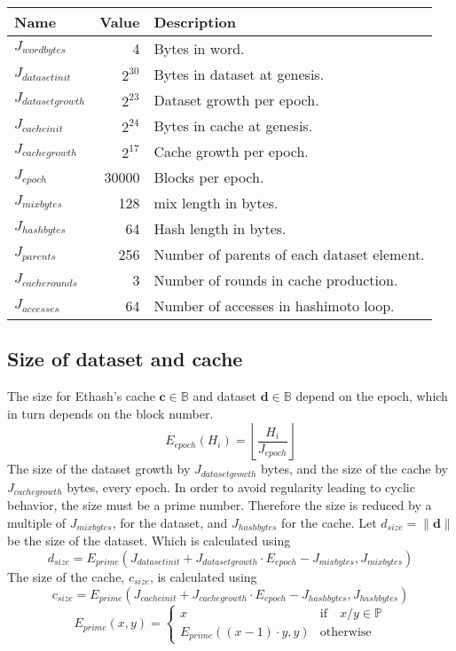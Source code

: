 \documentclass[9pt,oneside]{amsart}
\begin{document}
\begin{tabular*}{\columnwidth}[h]{lrl}
\toprule
Name & Value & Description \\
\midrule
$J_{wordbytes}$ & 4  & Bytes in word. \\
$J_{datasetinit}$ & $2^{30}$ & Bytes in dataset at genesis. \\
$J_{datasetgrowth}$ & $2^{23}$ & Dataset growth per epoch. \\
$J_{cacheinit}$ & $2^{24}$ & Bytes in cache at genesis. \\
$J_{cachegrowth}$ & $2^{17}$ & Cache growth per epoch. \\
$J_{epoch}$ & 30000 & Blocks per epoch. \\
$J_{mixbytes}$ & 128 & mix length in bytes. \\
$J_{hashbytes}$ & 64 & Hash length in bytes. \\
$J_{parents}$ & 256 & Number of parents of each dataset element. \\
$J_{cacherounds}$ & 3 & Number of rounds in cache production. \\
$J_{accesses}$ & 64 & Number of accesses in hashimoto loop. \\
\bottomrule
\end{tabular*}

\subsection{Size of dataset and cache}
The size for Ethash's cache $\mathbf{c} \in \mathbb{B}$  and dataset $\mathbf{d} \in \mathbb{B}$ depend on the epoch, which in turn depends on the block number.
\begin{equation}
 E_{epoch}(H_i) = \left\lfloor\frac{H_i}{J_{epoch}}\right\rfloor
\end{equation}
The size of the dataset growth by $J_{datasetgrowth}$ bytes, and the size of the cache by $J_{cachegrowth}$ bytes, every epoch. In order to avoid regularity leading to cyclic behavior, the size must be a prime number. Therefore the size is reduced by a multiple of $J_{mixbytes}$, for the dataset, and $J_{hashbytes}$ for the cache.
Let $d_{size} = \lVert \mathbf{d} \rVert$ be the size of the dataset. Which is calculated using
\begin{equation}
 d_{size} = E_{prime}(J_{datasetinit} + J_{datasetgrowth} \cdot E_{epoch} - J_{mixbytes}, J_{mixbytes})
\end{equation}
The size of the cache, $c_{size}$, is calculated using
\begin{equation}
 c_{size} = E_{prime}(J_{cacheinit} + J_{cachegrowth} \cdot E_{epoch} - J_{hashbytes}, J_{hashbytes})
\end{equation}
\begin{equation}
 E_{prime}(x, y) = \begin{cases}
x & \text{if} \quad x / y \in \mathbb{P} \\
E_{prime}((x - 1) \cdot y, y) & \text{otherwise}
\end{cases}
\end{equation}
\end{document}
